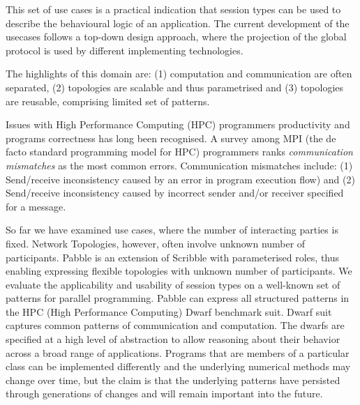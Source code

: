 This set of use cases is a practical indication that session types can be used to describe the behavioural logic of an application. The current development of the usecases follows a top-down design approach, where the projection of the global protocol is used by different
implementing technologies.

The highlights of this domain are: (1) computation and communication are often separated, (2) topologies are scalable and thus parametrised and (3) topologies are reusable, comprising limited set of patterns. 

Issues with High Performance Computing (HPC) programmers productivity and programs correctness has long been recognised. A survey among MPI (the de facto standard programming model for HPC) programmers \cite{MPIErrors} ranks \textit{communication mismatches} as the most common errors. Communication mismatches include: (1) Send/receive inconsistency caused by an error in program execution flow) and (2) Send/receive inconsistency caused by incorrect sender and/or receiver specified for a message. 


So far we have examined use cases, where the number of interacting parties is fixed. Network Topologies, however, often involve unknown number of participants. 
Pabble is an extension of Scribble with parameterised roles, thus enabling expressing flexible topologies with unknown number of participants. We evaluate the applicability and usability of session types on a well-known set of patterns for parallel programming. Pabble can express all structured patterns in the HPC (High Performance Computing) Dwarf benchmark suit. Dwarf suit captures common patterns of communication and computation. %
The dwarfs are specified at a high level of abstraction to allow reasoning about their behavior across a broad range of applications. Programs that are members of a particular class can be implemented differently and the underlying numerical methods may change over time, but the claim is that the underlying patterns have persisted through generations of changes and will remain important into the future. 

